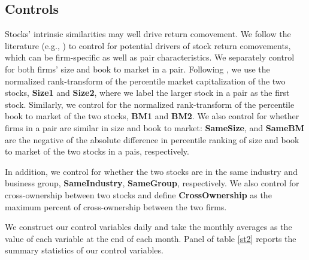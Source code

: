 \subsection{Controls}
\label{control}
 Stocks' intrinsic similarities may well drive return comovement. We follow the literature (e.g., \cite{AntonPolk}) to control for potential drivers of stock return comovements, which can be firm-specific as well as pair characteristics. We separately control for both firms' size and book to market in a pair. Following \cite{AntonPolk}, we use the normalized rank-transform of the percentile market capitalization of the two stocks, \textbf{Size1} and \textbf{Size2}, where we label the larger stock in a pair as the first stock. Similarly, we control for the normalized rank-transform of the percentile book to market of the two stocks, \textbf{BM1} and \textbf{BM2}. 
 We also control for whether firms in a pair are similar in size and book to market: \textbf{SameSize}, and \textbf{SameBM} are the negative of the absolute difference in percentile ranking of size and book to market of the two stocks in a pais, respectively. 
 
 In addition, we control for whether the two stocks are in the same industry and business group, \textbf{SameIndustry}, \textbf{SameGroup}, respectively. We also control for cross-ownership between two stocks and define  \textbf{CrossOwnership} as the maximum percent of cross-ownership between the two firms.


%				



We construct our control variables daily and take the monthly averages as the value of each variable at the end of each month. Panel  of table \ref{st2} reports the summary statistics of our control variables.


